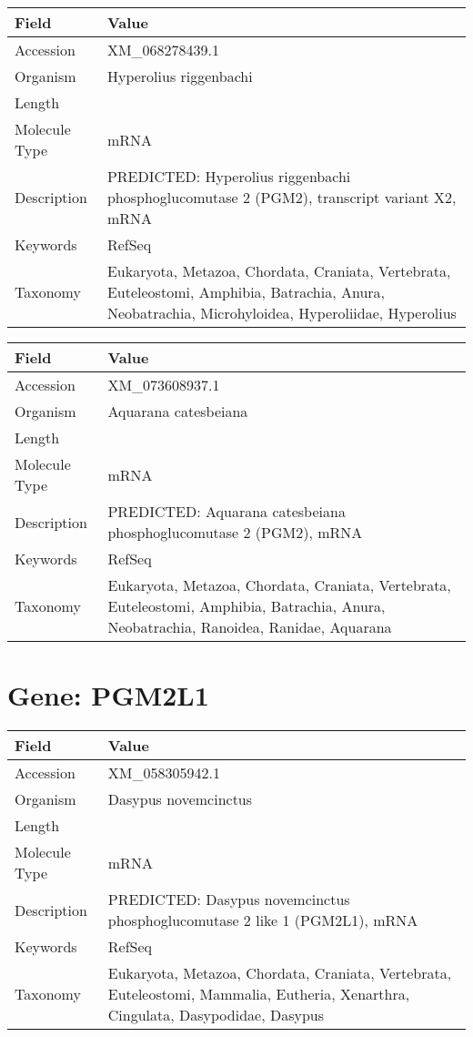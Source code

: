 \documentclass[10pt]{article}
\begin{document}
\vspace{1em}
{\footnotesize
\begin{longtable}{>{\raggedright\arraybackslash}p{4.5cm} >{\raggedright\arraybackslash}p{11.5cm}}
\textbf{Field} & \textbf{Value} \\
\hline
Accession & XM\_068278439.1 \\
Organism & Hyperolius riggenbachi \\
Length & 3761 \\
Molecule Type & mRNA \\
Description & PREDICTED: Hyperolius riggenbachi phosphoglucomutase 2 (PGM2), transcript variant X2, mRNA \\
Keywords & RefSeq \\
Taxonomy & Eukaryota, Metazoa, Chordata, Craniata, Vertebrata, Euteleostomi, Amphibia, Batrachia, Anura, Neobatrachia, Microhyloidea, Hyperoliidae, Hyperolius \\
\end{longtable}
}

\vspace{1em}
{\footnotesize
\begin{longtable}{>{\raggedright\arraybackslash}p{4.5cm} >{\raggedright\arraybackslash}p{11.5cm}}
\textbf{Field} & \textbf{Value} \\
\hline
Accession & XM\_073608937.1 \\
Organism & Aquarana catesbeiana \\
Length & 3149 \\
Molecule Type & mRNA \\
Description & PREDICTED: Aquarana catesbeiana phosphoglucomutase 2 (PGM2), mRNA \\
Keywords & RefSeq \\
Taxonomy & Eukaryota, Metazoa, Chordata, Craniata, Vertebrata, Euteleostomi, Amphibia, Batrachia, Anura, Neobatrachia, Ranoidea, Ranidae, Aquarana \\
\end{longtable}
}

\vspace{1em}
\section{Gene: PGM2L1}
{\footnotesize
\begin{longtable}{>{\raggedright\arraybackslash}p{4.5cm} >{\raggedright\arraybackslash}p{11.5cm}}
\textbf{Field} & \textbf{Value} \\
\hline
Accession & XM\_058305942.1 \\
Organism & Dasypus novemcinctus \\
Length & 7732 \\
Molecule Type & mRNA \\
Description & PREDICTED: Dasypus novemcinctus phosphoglucomutase 2 like 1 (PGM2L1), mRNA \\
Keywords & RefSeq \\
Taxonomy & Eukaryota, Metazoa, Chordata, Craniata, Vertebrata, Euteleostomi, Mammalia, Eutheria, Xenarthra, Cingulata, Dasypodidae, Dasypus \\
\end{longtable}
}
\end{document}
